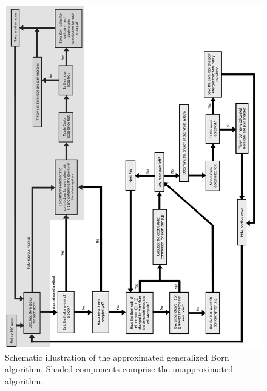 \documentclass[12pt]{report}
\begin{document}
\begin{figure}[htp]
\centering
\includegraphics[scale=0.59]{figures/pdf/flow1.pdf}
\caption{Schematic illustration of the approximated generalized Born algorithm. Shaded components comprise the unapproximated algorithm.}
\label{map}
\end{figure}
\end{document}
